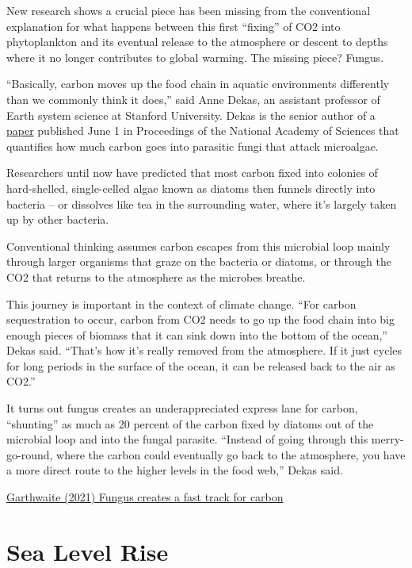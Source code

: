 \documentclass[
]{book}
\begin{document}
New research shows a crucial piece has been missing from the conventional explanation for what happens between this first ``fixing'' of CO2 into phytoplankton and its eventual release to the atmosphere or descent to depths where it no longer contributes to global warming. The missing piece? Fungus.

``Basically, carbon moves up the food chain in aquatic environments differently than we commonly think it does,'' said Anne Dekas, an assistant professor of Earth system science at Stanford University. Dekas is the senior author of a
\href{https://doi.org/10.1073/pnas.2102225118}{paper}
published June 1 in Proceedings of the National Academy of Sciences that quantifies how much carbon goes into parasitic fungi that attack microalgae.

Researchers until now have predicted that most carbon fixed into colonies of hard-shelled, single-celled algae known as diatoms then funnels directly into bacteria -- or dissolves like tea in the surrounding water, where it's largely taken up by other bacteria.

Conventional thinking assumes carbon escapes from this microbial loop mainly through larger organisms that graze on the bacteria or diatoms, or through the CO2 that returns to the atmosphere as the microbes breathe.

This journey is important in the context of climate change. ``For carbon sequestration to occur, carbon from CO2 needs to go up the food chain into big enough pieces of biomass that it can sink down into the bottom of the ocean,'' Dekas said. ``That's how it's really removed from the atmosphere. If it just cycles for long periods in the surface of the ocean, it can be released back to the air as CO2.''

It turns out fungus creates an underappreciated express lane for carbon, ``shunting'' as much as 20 percent of the carbon fixed by diatoms out of the microbial loop and into the fungal parasite. ``Instead of going through this merry-go-round, where the carbon could eventually go back to the atmosphere, you have a more direct route to the higher levels in the food web,'' Dekas said.

\href{https://earth.stanford.edu/news/fungus-creates-fast-track-carbon\#gs.5hnti5}{Garthwaite (2021) Fungus creates a fast track for carbon}

\hypertarget{sea-level-rise}{%
\section{Sea Level Rise}\label{sea-level-rise}}
\end{document}
